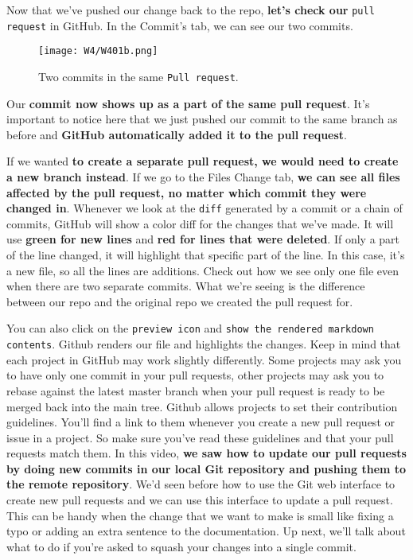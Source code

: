	Now that we've pushed our change back to the repo, \textbf{let's check our} \texttt{pull request} in GitHub. In the Commit's tab, we can see our two commits.
	
	\begin{figure} 
		\caption{Two commits in the same \texttt{Pull request}.}
		\centering
		\texttt{[image: W4/W401b.png]}
		\label{W401b}
	\end{figure}
	
	Our \textbf{commit now shows up as a part of the same pull request}. It's important to notice here that we just pushed our commit to the same branch as before and \textbf{GitHub automatically added it to the pull request}. 
	
	If we wanted\textbf{ to create a separate pull request, we would need to create a new branch instead}. If we go to the Files Change tab, \textbf{we can see all files affected by the pull request, no matter which commit they were changed in}. Whenever we look at the \verb|diff| generated by a commit or a chain of commits, GitHub will show a color diff for the changes that we've made. It will use \textbf{green for new lines} and \textbf{red for lines that were deleted}. If only a part of the line changed, it will highlight that specific part of the line. In this case, it's a new file, so all the lines are additions. Check out how we see only one file even when there are two separate commits. What we're seeing is the difference between our repo and the original repo we created the pull request for. 
	
	You can also click on the \texttt{preview icon} and \texttt{show the rendered markdown contents}. Github renders our file and highlights the changes. Keep in mind that each project in GitHub may work slightly differently. Some projects may ask you to have only one commit in your pull requests, other projects may ask you to rebase against the latest master branch when your pull request is ready to be merged back into the main tree. Github allows projects to set their contribution guidelines. You'll find a link to them whenever you create a new pull request or issue in a project. So make sure you've read these guidelines and that your pull requests match them. In this video, \textbf{we saw how to update our pull requests by doing new commits in our local Git repository and pushing them to the remote repository}. We'd seen before how to use the Git web interface to create new pull requests and we can use this interface to update a pull request. This can be handy when the change that we want to make is small like fixing a typo or adding an extra sentence to the documentation. Up next, we'll talk about what to do if you're asked to squash your changes into a single commit.
	
